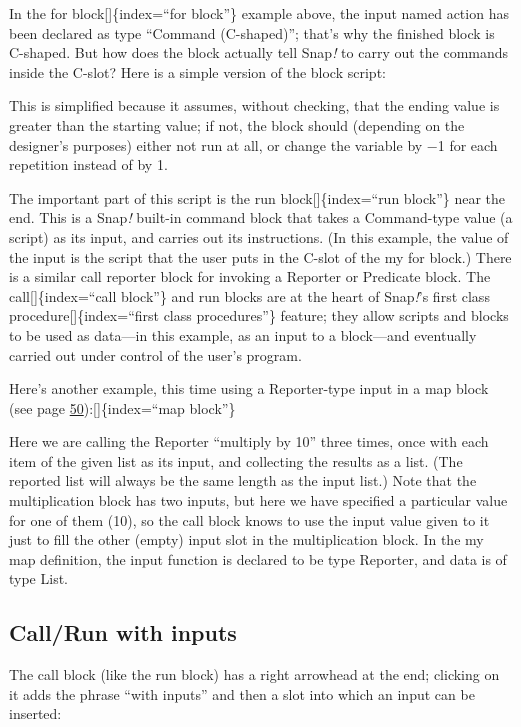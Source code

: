 \documentclass[
  letterpaper,
]{book}
\begin{document}
In the for block{[}{]}\{index=``for block''\} example above, the input
named action has been declared as type ``Command (C-shaped)''; that's
why the finished block is C-shaped. But how does the block actually tell
Snap\emph{!} to carry out the commands inside the C-slot? Here is a
simple version of the block script:

This is simplified because it assumes, without checking, that the ending
value is greater than the starting value; if not, the block should
(depending on the designer's purposes) either not run at all, or change
the variable by −1 for each repetition instead of by 1.

The important part of this script is the run block{[}{]}\{index=``run
block''\} near the end. This is a Snap\emph{!} built-in command block
that takes a Command-type value (a script) as its input, and carries out
its instructions. (In this example, the value of the input is the script
that the user puts in the C-slot of the my for block.) There is a
similar call reporter block for invoking a Reporter or Predicate block.
The call{[}{]}\{index=``call block''\} and run blocks are at the heart
of Snap\emph{!}'s ﬁrst class procedure{[}{]}\{index=``ﬁrst class
procedures''\} feature; they allow scripts and blocks to be used as
data---in this example, as an input to a block---and eventually carried
out under control of the user's program.

Here's another example, this time using a Reporter-type input in a map
block (see page \hyperref[map]{50}):{[}{]}\{index=``map block''\}

Here we are calling the Reporter ``multiply by 10'' three times, once
with each item of the given list as its input, and collecting the
results as a list. (The reported list will always be the same length as
the input list.) Note that the multiplication block has two inputs, but
here we have specified a particular value for one of them (10), so the
call block knows to use the input value given to it just to fill the
other (empty) input slot in the multiplication block. In the my map
definition, the input function is declared to be type Reporter, and data
is of type List.

\subsection{Call/Run with inputs}\label{callrun-with-inputs}

The call block (like the run block) has a right arrowhead at the end;
clicking on it adds the phrase ``with inputs'' and then a slot into
which an input can be inserted:
\end{document}
